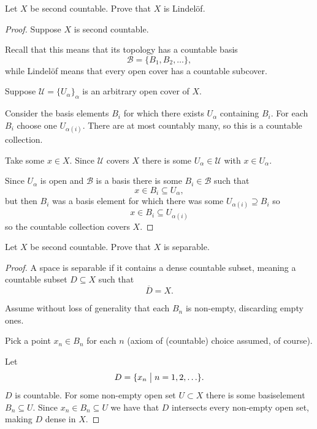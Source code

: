 \documentclass[11pt]{article}
\begin{document}
\begin{prob}
    Let $X$ be second countable. Prove that 
    $X$ is Lindel{\"o}f. 
\end{prob}
\begin{proof}
    Suppose $X$ is second countable. 

    Recall that this means that 
    its topology has a countable basis 
    \[
        \mathcal B =\{B_1,B_2,\ldots\}, 
    \]
    while Lindel{\"o}f means that every open cover 
    has a countable subcover. 

    Suppose $\mathcal U = \{U_\alpha\}_\alpha$ is 
    an arbitrary open cover of $X$. 

    Consider the basis elements 
    $B_i$ for which there exists $U_\alpha$ containing 
    $B_i$. 
    For each $B_i$ choose one 
    $U_{\alpha(i)}$. There are at most countably 
    many, so this is a countable collection. 

    Take some $x \in X$. Since $\mathcal U$ covers 
    $X$ there is some $U_\alpha \in \mathcal U$ 
    with $x\in U_\alpha$. 

    Since $U_\alpha$ is open and $\mathcal B$ is a basis 
    there is some $B_i \in \mathcal B$ such that 
    \[
        x \in B_i \subseteq U_\alpha, 
    \]
    but then $B_i$ was a basis element for which 
    there was some $U_{\alpha(i)} \supseteq B_i$ 
    so 
    \[
        x \in B_i \subseteq U_{\alpha(i)} 
    \]
    so the countable collection covers $X$.

\end{proof}

\begin{prob}
    Let $X$ be second countable. Prove that 
    $X$ is separable. 
\end{prob}

\begin{proof}
    A space is separable if it contains a 
    dense countable subset, meaning a 
    countable subset $D \subseteq X$ such that 
    \[
        \overline D = X. 
    \]

    Assume without loss of generality that each 
    $B_n$ is non-empty, discarding empty ones. 

    Pick a point $x_n \in B_n$ for each $n$ (axiom of 
    (countable) choice assumed, of course).
    
    Let 
    \[
        D = \{x_n \bigm| n = 1,2,\ldots\}. 
    \]
    $D$ is countable. 
    For some non-empty open set $U \subset X$ 
    there is some basiselement $B_n \subseteq U$. 
    Since $x_n \in B_n \subseteq U$ we have 
    that $D$ intersects every non-empty open set, 
    making $D$ dense in $X$.
\end{proof}
\end{document}
